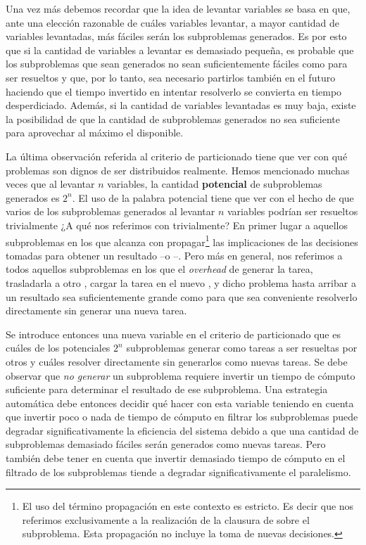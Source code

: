 Una vez más debemos recordar que la idea de levantar variables se basa en que,
ante una elección razonable de cuáles variables levantar, a mayor cantidad de
variables levantadas, más fáciles serán los subproblemas generados. Es por
esto que si la cantidad de variables a levantar es demasiado pequeña, es
probable que los subproblemas que sean generados no sean suficientemente 
fáciles como para ser resueltos y que, por lo tanto, sea necesario partirlos también en el
futuro haciendo que el tiempo invertido en intentar resolverlo se convierta en
tiempo desperdiciado. Además, si la cantidad de variables levantadas es muy
baja, existe la posibilidad de que la cantidad de subproblemas generados no
sea suficiente para aprovechar al máximo el \hard disponible.

La última observación referida al criterio de particionado tiene que ver con
qué problemas son dignos de ser distribuidos realmente. Hemos mencionado
muchas veces que al levantar $n$ variables, la cantidad \textbf{potencial} de
subproblemas generados es $2^n$. El uso de la palabra potencial tiene que ver
con el hecho de que varios de los subproblemas generados al levantar $n$
variables podrían ser resueltos trivialmente ¿A qué nos referimos con
trivialmente? En primer lugar a aquellos subproblemas en los que alcanza con
propagar\footnote{El uso del término propagación en este contexto es estricto.
Es decir que nos referimos exclusivamente a la realización de la clausura de
\bcp sobre el subproblema. Esta propagación no incluye la toma de nuevas
decisiones.} las implicaciones de las decisiones tomadas para obtener un
resultado --\sat o \unsat--. Pero más en general, nos referimos a todos
aquellos subproblemas en los que el \emph{overhead} de generar la tarea,
trasladarla a otro \w, cargar la tarea en el nuevo \w, y \solvear dicho
problema hasta arribar a un resultado sea suficientemente grande como para que
sea conveniente resolverlo directamente sin generar
una nueva tarea.

Se introduce entonces una nueva variable en el criterio de particionado que es
cuáles de los potenciales $2^n$ subproblemas generar como tareas a ser
resueltas por otros \ws y cuáles resolver directamente sin generarlos como nuevas
tareas. Se debe observar que \emph{no generar} un subproblema requiere invertir
un tiempo de cómputo suficiente para determinar el resultado de ese
subproblema. Una estrategia automática debe entonces decidir qué hacer con
esta variable teniendo en cuenta que invertir poco o nada de tiempo de cómputo
en filtrar los subproblemas puede degradar significativamente la eficiencia
del sistema debido a que una cantidad de subproblemas
demasiado fáciles serán generados como nuevas tareas. Pero también debe tener en cuenta que invertir demasiado
tiempo de cómputo en el filtrado de los subproblemas tiende a degradar
significativamente el paralelismo.

